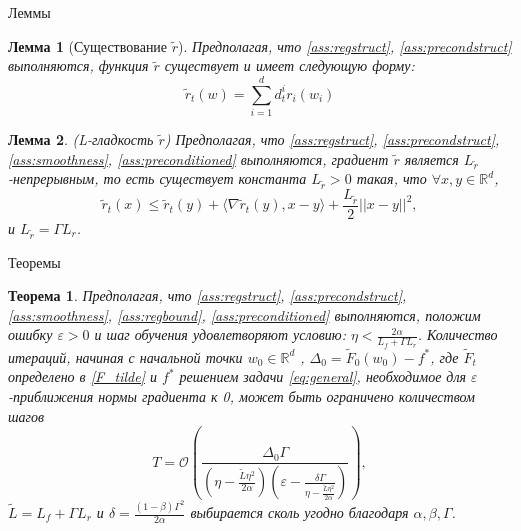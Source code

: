 \documentclass[aspectratio=169, 12pt]{beamer}
\newtheorem{theorem_rus}{Теорема}
\newtheorem{lemma_rus}{Лемма}
\begin{document}
\begin{frame}{Леммы}
    \begin{lemma_rus}[Существование $\widetilde{r}$]
\label{lemma:existence}
    Предполагая, что \ref{ass:regstruct}, \ref{ass:precondstruct} выполняются, функция $\widetilde{r}$ существует и имеет следующую форму:
    $$\widetilde{r}_t(w) = \sum_{i=1}^d d_t^i r_i(w_i)$$
\end{lemma_rus}

\begin{lemma_rus}\label{lemma:tildesmoothness}{(L-гладкость $\widetilde{r}$)}
Предполагая, что \ref{ass:regstruct}, \ref{ass:precondstruct}, \ref{ass:smoothness}, \ref{ass:preconditioned} выполняются,
градиент $\widetilde{r}$ является $L_{\tilde{r}}$-непрерывным, 
то есть существует константа  $L_{\tilde{r}} > 0$ такая, что $\forall x, y \in \mathbb{R}^d$,
\begin{equation*}
    		\widetilde{r}_t(x) \leq \widetilde{r}_t(y) + \langle \nabla \widetilde{r}_t(y), x-y \rangle + \frac{L_{\tilde{r}}}{2} ||x - y||^2,
    	\end{equation*}
     и $L_{\tilde{r}} = \Gamma L_r$.
\end{lemma_rus}
\end{frame}

\begin{frame}{Теоремы}
    \begin{theorem_rus} 
    \label{theor:1}
    Предполагая, что \ref{ass:regstruct}, \ref{ass:precondstruct}, \ref{ass:smoothness}, \ref{ass:regbound}, \ref{ass:preconditioned} выполняются, положим ошибку $\varepsilon > 0$ и шаг обучения удовлетворяют условию: $\eta < \frac{2 \alpha}{L_f + \Gamma L_{r}}$.
    Количество итераций, начиная с начальной точки $w_0 \in \mathbb{R}^d$ , $\Delta_0 = \tilde{F}_0(w_0) - f^*$, где $\widetilde{F}_t$ определено в \eqref{F_tilde} и $f^*$ решением задачи \eqref{eq:general}, 
    необходимое для $\varepsilon$-приближения нормы градиента к 0, может быть ограничено количеством шагов    
    \begin{equation*}
      T = \mathcal{O}\left( \frac{\Delta_0 \Gamma}{(\eta - \frac{\tilde{L}\eta^2}{2\alpha}) \left( \varepsilon -\frac{\delta\Gamma}{\eta - \frac{\tilde{L}\eta^2}{2\alpha}}\right)} \right),
\end{equation*}
$\widetilde{L} = L_f + \Gamma L_{r}$ и $\delta=\frac{(1 - \beta)\Gamma^2}{2\alpha}$ выбирается сколь угодно благодаря $\alpha, \beta, \Gamma$. 
\end{theorem_rus}
\end{frame}
\end{document}
